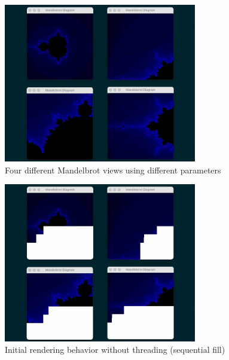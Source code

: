 \documentclass[a4paper,12pt]{article}
\begin{document}
\begin{figure}[H]
    \centering
    \includegraphics[width=0.75\textwidth]{lab02-img02}
    \caption{Four different Mandelbrot views using different parameters}
    \label{fig:mandelbrot_views}
\end{figure}

\begin{figure}[H]
    \centering
    \includegraphics[width=0.75\textwidth]{lab02-img03}
    \caption{Initial rendering behavior without threading (sequential fill)}
    \label{fig:mandelbrot_seq}
\end{figure}
\end{document}
